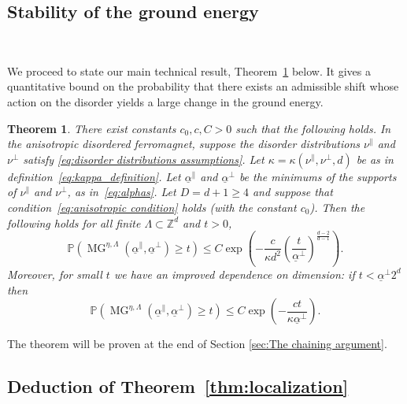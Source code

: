 \documentclass[11pt, reqno]{amsart}
\newtheorem{theorem}{Theorem}[section]
\newcommand{\Z}{\mathbb{Z}}
\DeclareMathOperator{\MG}{MG}
\renewcommand{\P}{\mathbb{P}}
\numberwithin{equation}{section}
\begin{document}
\smallskip

\subsection{Stability of the ground energy}
\label{sec:stability of the ground energy}~

We proceed to state our main technical result, Theorem~\ref{thm:Existence of admissible ensemble is unlikely} below. It gives a quantitative bound on the probability that there exists an admissible shift whose action on the disorder yields a large change in the ground energy.

\begin{theorem}\label{thm:Existence of admissible ensemble is unlikely}
There exist constants $c_0,c,C>0$ such that the following holds. 
In the anisotropic disordered ferromagnet, suppose the disorder distributions
$\nu^{\parallel}$ and $\nu^{\perp}$ satisfy \eqref{eq:disorder distributions assumptions}.
Let $\kappa=\kappa(\nu^\parallel, \nu^\perp,d)$ be as in definition~\eqref{eq:kappa_definition}. 
Let $\underline{\alpha}^{\parallel}$ and $\underline{\alpha}^{\perp}$ be the minimums of the supports of $\nu^\parallel$ and $\nu^\perp$, as in~\eqref{eq:alphas}.
Let $D=d+1\ge 4$ and suppose that condition~\eqref{eq:anisotropic condition} holds (with the constant $c_0$).
Then the following holds for all finite $\Lambda\subset\Z^d$ and $t>0$,
\begin{equation}\label{eq:tau localization bound}
\P\left(\MG^{\eta,\Lambda}(\underline{\alpha}^{\parallel},\underline{\alpha}^{\perp}) \geq t \right)\leq C\exp \left(-\frac{c}{\kappa  d^2} \left( \frac{t}{\underline{\alpha}^{\perp}}\right)^{\frac{d-2}{d-1}} \right).
\end{equation}
Moreover, for small $t$ we have an improved dependence on dimension: 
if $t < \underline{\alpha}^{\perp} 2^d$ then
\begin{equation}
\P\left(\MG^{\eta,\Lambda}(\underline{\alpha}^{\parallel},\underline{\alpha}^{\perp}) \geq t \right)\leq C\exp \left(-\frac{c t}{\kappa \underline{\alpha}^{\perp}} \right). \end{equation}
\end{theorem}

The theorem will be proven at the end of Section \ref{sec:The chaining argument}. 

\subsection{Deduction of Theorem~\ref{thm:localization}}\label{sec:deduction of localization theorem}
\end{document}
